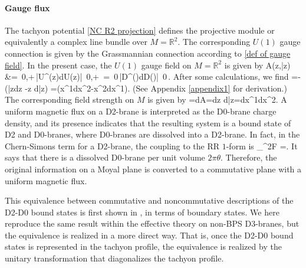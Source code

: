 \documentclass[12pt]{article}
\numberwithin{equation}{section}
\newcommand{\Bra}[1]{\left\langle\, #1\,\right|}
\newcommand{\Ket}[1]{\left|\, #1\,\right\rangle}
\def\real{\mathbb{R}}
\def\bea#1\ena{\begin{align}#1\end{align}}
\begin{document}
\paragraph{Gauge flux}
The tachyon potential \eqref{NC R2 projection} defines the projective module
or equivalently a complex line bundle over $M=\real^2$.
The corresponding $U(1)$ gauge connection is given by the 
Grassmannian connection
according to \eqref{def of gauge field}.
In the present case, the $U(1)$ gauge field on $M=\real^2$ is given by
\bea
iA(z,\bar{z})
&=\Bra{0,+}U^\dagger (z)dU(z)\Ket{0,+}
=\Bra{0}D^\dagger (\alpha)dD(\alpha)\Ket{0}.
\ena
After some calculations, we find 
\bea
A=-(\bar{z}dz -z d\bar{z})
=(x^1dx^2-x^2dx^1).
\ena
{(See Appendix \ref{appendix1} for derivation.)}
The corresponding field strength on $M$ is given by
\bea
F=dA=dz \wedge d\bar{z}=dx^1\wedge dx^2.
\label{gauge flux for Moyal}
\ena
A uniform magnetic flux on a D2-brane is interpreted as the D0-brane charge density,
and its presence indicates that the resulting system is a bound state of D2 and D0-branes,
where D0-branes are dissolved into a D2-brane.
In fact, in the Chern-Simons term for a D2-brane, 
the coupling to the RR $1$-form is 
\bea
\frac{1}{2\pi}\int_{\real^2}F
=\frac{{\rm Vol}(\real^2)}{2\pi \theta}.
\ena
It says that there is a dissolved D0-brane per unit volume $2\pi \theta$.
Therefore, the original information on a Moyal plane 
is converted to a commutative plane with a uniform magnetic flux.

This equivalence between commutative and noncommutative descriptions 
of the D2-D0 bound states is first shown in {\cite{Ishibashi1999}}, in terms of boundary states.
We here reproduce the same result within the effective theory on non-BPS D3-branes,
but the equivalence is realized in a more direct way.
That is, once the D2-D0 bound states is represented in the tachyon profile, 
the equivalence is realized by the unitary transformation that diagonalizes the 
tachyon profile.
\end{document}
